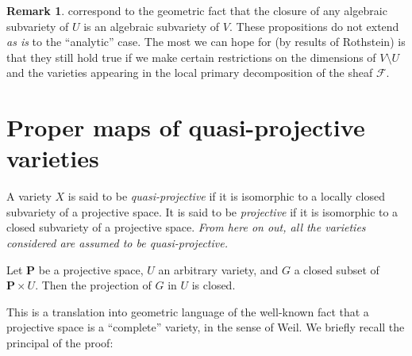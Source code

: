 \documentclass{article}
\theoremstyle{plain}
\newenvironment{lemma}[1]
    {\renewcommand\theinnercustomlemma{#1}\innercustomlemma}
    {\endinnercustomlemma}
\theoremstyle{definition}
\newtheorem*{remark}{Remark}
\newcommand{\sh}[1]{{\mathscr{#1}}}
\newcommand{\PP}{\mathbf{P}}
\begin{document}
\begin{remark}
   correspond to the geometric fact that the closure of any algebraic subvariety of $U$ is an algebraic subvariety of $V$.
  These propositions do not extend \emph{as is} to the ``analytic'' case.
  The most we can hope for (by results of Rothstein) is that they still hold true if we make certain restrictions on the dimensions of $V\setminus U$ and the varieties appearing in the local primary decomposition of the sheaf $\sh{F}$.
\end{remark}


\section{Proper maps of quasi-projective varieties}
\label{section2}

A variety $X$ is said to be \emph{quasi-projective} if it is isomorphic to a locally closed subvariety of a projective space.
It is said to be \emph{projective} if it is isomorphic to a closed subvariety of a projective space.
\emph{From here on out, all the varieties considered are assumed to be quasi-projective.}

\begin{lemma}{3}
\label{lemma3}
  Let $\PP$ be a projective space, $U$ an arbitrary variety, and $G$ a closed subset of $\PP\times U$.
  Then the projection of $G$ in $U$ is closed.
\end{lemma}

This is a translation into geometric language of the well-known fact that a projective space is a ``complete'' variety, in the sense of Weil.
We briefly recall the principal of the proof:
\end{document}
